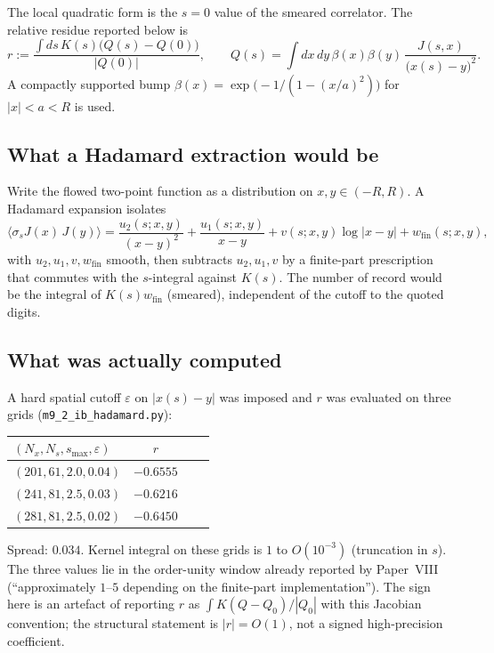 \documentclass[11pt]{article}
\theoremstyle{definition}
\begin{document}
The local quadratic form is the $s=0$ value of the smeared correlator.
The relative residue reported below is
\begin{equation}
r
:=
\frac{\displaystyle\int ds\,K(s)\bigl(Q(s)-Q(0)\bigr)}{|Q(0)|},
\qquad
Q(s)
=
\int\!dx\,dy\,\beta(x)\beta(y)\,
\frac{J(s,x)}{\bigl(x(s)-y\bigr)^2}.
\label{eq:r}
\end{equation}
A compactly supported bump
$\beta(x)=\exp\bigl(-1/(1-(x/a)^2)\bigr)$ for $|x|<a<R$ is used.

\subsection{What a Hadamard extraction would be}

Write the flowed two-point function as a distribution on
$x,y\in(-R,R)$. A Hadamard expansion isolates
\begin{equation}
\langle\sigma_s J(x)\,J(y)\rangle
=
\frac{u_2(s;x,y)}{(x-y)^2}
+
\frac{u_1(s;x,y)}{x-y}
+
v(s;x,y)\log|x-y|
+
w_{\mathrm{fin}}(s;x,y),
\label{eq:hadamard}
\end{equation}
with $u_2,u_1,v,w_{\mathrm{fin}}$ smooth, then subtracts
$u_2,u_1,v$ by a finite-part prescription that commutes with the
$s$-integral against $K(s)$. The number of record would be the
integral of $K(s)w_{\mathrm{fin}}$ (smeared), independent of the
cutoff to the quoted digits.

\subsection{What was actually computed}

A hard spatial cutoff $\varepsilon$ on $|x(s)-y|$ was imposed and
$r$ was evaluated on three grids
(\texttt{m9\_2\_ib\_hadamard.py}):

\begin{center}
\begin{tabular}{@{}lccc@{}}
\toprule
$(N_x,N_s,s_{\max},\varepsilon)$ & $r$ \\
\midrule
$(201,61,2.0,0.04)$ & $-0.6555$ \\
$(241,81,2.5,0.03)$ & $-0.6216$ \\
$(281,81,2.5,0.02)$ & $-0.6450$ \\
\bottomrule
\end{tabular}
\end{center}

Spread: $0.034$. Kernel integral on these grids is $1$ to
$O(10^{-3})$ (truncation in $s$). The three values lie in the
order-unity window already reported by Paper~VIII (``approximately
$1$--$5$ depending on the finite-part implementation''). The sign
here is an artefact of reporting $r$ as
$\int K(Q-Q_0)/|Q_0|$ with this Jacobian convention; the structural
statement is $|r|=O(1)$, not a signed high-precision coefficient.
\end{document}
